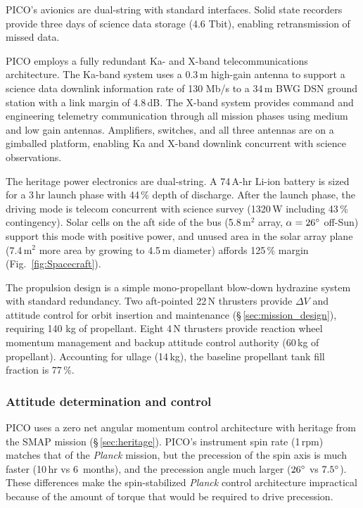 PICO's avionics are dual-string with standard interfaces. Solid state
recorders provide three days of science data storage (4.6 Tbit), enabling
retransmission of missed data.

PICO employs a fully redundant Ka- and X-band telecommunications
architecture. The Ka-band system uses a 0.3\,m high-gain antenna to
support a science data downlink information rate of 130 Mb/s to a
34\,m BWG DSN ground station with a link margin of 4.8\,dB. The X-band
system provides command and engineering telemetry communication
through all mission phases using medium and low gain
antennas. Amplifiers, switches, and all three antennas are on a
gimballed platform, enabling Ka and X-band downlink concurrent with
science observations.

 The heritage power electronics are dual-string.
A 74\,A-hr Li-ion battery is sized for a 3\,hr launch phase with 44\,\% depth of discharge. 
After the launch phase, the driving
mode is telecom concurrent with science survey (1320\,W including 43\,\% contingency). 
Solar cells on the aft side of the bus (5.8\,m$^2$ array, $\alpha=26^\circ$ off-Sun) support this mode with positive power,  and unused area in the solar array plane (7.4\,m$^2$ more area by growing to 4.5\,m diameter) affords 125\,\% margin
(Fig.~\ref{fig:Spacecraft}).

The propulsion design is a simple mono-propellant blow-down hydrazine
system with standard redundancy. Two aft-pointed 22\,N thrusters
provide $\Delta V$ and attitude control for orbit insertion and
maintenance (\S\,\ref{sec:mission_design}), requiring 140 kg of
propellant.  Eight 4\,N thrusters provide reaction wheel momentum
management and backup attitude control authority (60\,kg of
propellant). Accounting for ullage (14\,kg), the baseline propellant
tank fill fraction is 77\,\%.


\subsubsection{Attitude determination and control}
\label{sec:attitude_determination} %

PICO uses a zero net angular momentum control architecture with
heritage from the SMAP mission (\S\,\ref{sec:heritage}). PICO's instrument
spin rate (1\,rpm) matches that of the \textit{Planck} mission, but
the precession of the spin axis is much faster (10\,hr vs 6\, months),
and the precession angle much larger ($26^\circ$ vs
$7.5^\circ$). These differences make the spin-stabilized
\textit{Planck} control architecture impractical because of the amount
of torque that would be required to drive precession.

